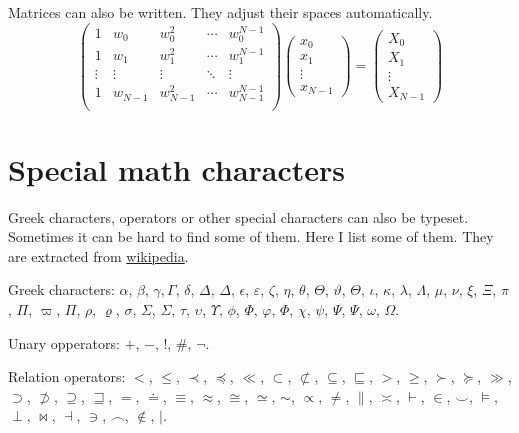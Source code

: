 \noindent Matrices can also be written. They adjust their spaces automatically.
\begin{equation}
    \begin{pmatrix}
        1 & w_0 & w_0^2 & \cdots & w_0^{N-1} \\
        1 & w_1 & w_1^2 & \cdots & w_1^{N-1} \\
        \vdots & \vdots & \vdots & \ddots & \vdots \\
        1 & w_{N-1} & w_{N-1}^2 & \cdots & w_{N-1}^{N-1} \\
    \end{pmatrix}
    \begin{pmatrix}
        x_0 \\ 
        x_1 \\
        \vdots \\
        x_{N-1}
    \end{pmatrix}
    =
    \begin{pmatrix}
        X_0 \\
        X_1 \\
        \vdots \\
        X_{N-1}
    \end{pmatrix}
\end{equation}



\section{Special math characters}
\noindent Greek characters, operators or other special characters can also be typeset. Sometimes it can be hard to find some of them. Here I list some of them. They are extracted from \href{https://oeis.org/wiki/List_of_LaTeX_mathematical_symbols}{wikipedia}.

\noindent Greek characters: $\alpha$, $\beta$, $\gamma, \Gamma$, $\delta$, $\Delta$, $\varDelta$, $\epsilon$, $\varepsilon$, $\zeta$, $\eta$, $\theta$, $\Theta$, $\vartheta$, $\varTheta$, $\iota$, $\kappa$, $\lambda$, $\Lambda$, $\mu$, $\nu$, $\xi$, $\Xi$, $\pi$, $\Pi$, $\varpi$, $\varPi$, $\rho$, $\varrho$, $\sigma$, $\Sigma$, $\varSigma$, $\tau$, $\upsilon$, $\Upsilon$, $\phi$, $\Phi$, $\varphi$, $\varPhi$, $\chi$, $\psi$, $\Psi$, $\varPsi$, $\omega$, $\Omega$.

\noindent Unary opperators: $+$, $-$, $!$, $\#$, $\neg$.

\noindent Relation operators: $<$, $\leq$, $\prec$,  $\preceq$,  $\ll$, $\subset$, $\not\subset$, $\subseteq$,  $\sqsubseteq$, $>$,  $\geq$,  $\succ$,  $\succeq$,  $\gg$,  $\supset$, $\not\supset$, $\supseteq$,  $\sqsupseteq$, $=$, $\doteq$, $\equiv$, $\approx$, $\cong$, $\simeq$, $\sim$, $\propto$, $\neq$, $\parallel$, $\asymp$, $\vdash$, $\in$, $\smile$, $\models$, $\perp$,  $\bowtie$, $\dashv$, $\ni$, $\frown$, $\notin$, $\mid$.

